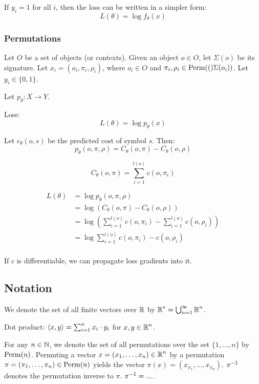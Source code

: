 If $y_i = 1$ for all $i$, then the loss can be written in a simpler form:
$$
L(\theta) = \log{f_\theta(x)}
$$

\subsubsection{Permutations}

Let $O$ be a set of objects (or contexts).
Given an object $o \in O$, let $\Sigma(o)$ be its signature.
Let $x_i = (o_i, \pi_i, \rho_i)$, where $o_i \in O$
and $\pi_i, \rho_i \in \mathrm{Perm}(()\Sigma(o_i))$.
Let $y_i \in \{0, 1\}$.

Let $p_\theta: X \to Y$.

Loss:
$$
L(\theta) = \log{p_\theta(x)}
$$

Let $c_\theta(o, s)$ be the predicted cost of symbol $s$.
Then:
$$
p_\theta(o, \pi, \rho) = C_\theta(o, \pi) - C_\theta(o, \rho)
$$

$$
C_\theta(o, \pi) = \sum_{i=1}^{l(o)}{c(o, \pi_i)}
$$

\begin{align*}
L(\theta) &= \log{p_\theta(o, \pi, \rho)} \\
&= \log{(C_\theta(o, \pi) - C_\theta(o, \rho))} \\
&= \log{(\sum_{i=1}^{l(o)}{c(o, \pi_i)} - \sum_{i=1}^{l(o)}{c(o, \rho_i)})} \\
&= \log{\sum_{i=1}^{l(o)}{c(o, \pi_i) - c(o, \rho_i)}} \\
\end{align*}

If $c$ is differentiable,
we can propagate loss gradients into it.

\subsection{Notation}

We denote the set of all finite vectors over $\operatorname{\mathbb{R}}$ by $\operatorname{\mathbb{R}}^* = \bigcup_{n=1}^\infty{\operatorname{\mathbb{R}}^n}$.

Dot product: $\left<x,y\right> = \sum_{i=1}^n x_i \cdot y_i$ for $x, y \in \operatorname{\mathbb{R}}^n$.

For any $n \in \operatorname{\mathbb{N}}$, we denote the set of all permutations over the set $\{1, \ldots, n\}$ by $\mathrm{Perm}(n)$.
Permuting a vector $x = (x_1, \ldots, x_n) \in \operatorname{\mathbb{R}}^n$ by a permutation $\pi = (\pi_1, \ldots, \pi_n) \in \mathrm{Perm}(n)$ yields the vector $\pi(x) = (x_{\pi_1}, \ldots, x_{\pi_n})$.
$\pi^{-1}$ denotes the permutation inverse to $\pi$.
$\pi^{-1} = ...$.


